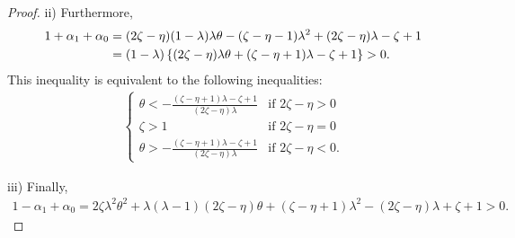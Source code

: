 \documentclass[letterpaper, 12pt, draftcls, onecolumn]{ieeeconf}
\begin{document}
\begin{proof}
ii) Furthermore,
\begin{align}
1+\alpha_1+\alpha_0
&=(2\zeta-\eta)(1-\lambda)\lambda\theta
-(\zeta-\eta-1)\lambda^2+(2\zeta-\eta)\lambda-\zeta+1\notag\\
&=(1-\lambda)\left\{
(2\zeta-\eta)\lambda\theta
+(\zeta-\eta+1)\lambda-\zeta+1
\right\}>0.\notag
\end{align}
This inequality is equivalent to the following inequalities:
\begin{align}
\begin{cases}
\theta <  -\frac{ (\zeta-\eta+1)\lambda-\zeta+1 }{ (2\zeta-\eta)\lambda }
& \text{if }2\zeta-\eta>0\\
\zeta > 1
& \text{if }2\zeta-\eta=0\\
\theta >  -\frac{ (\zeta-\eta+1)\lambda-\zeta+1 }{ (2\zeta-\eta)\lambda }
& \text{if }2\zeta-\eta<0.
\end{cases}
\label{2pJury-2}
\end{align}

iii) Finally,
\begin{align}
1-\alpha_1+\alpha_0
=2\zeta \lambda^2\theta^2
+\lambda(\lambda-1)(2\zeta-\eta)\theta
+(\zeta-\eta+1)\lambda^2-(2\zeta-\eta)\lambda+\zeta+1 
>0.
\label{2pJury-3}
\end{align}



\end{proof}
\end{document}

